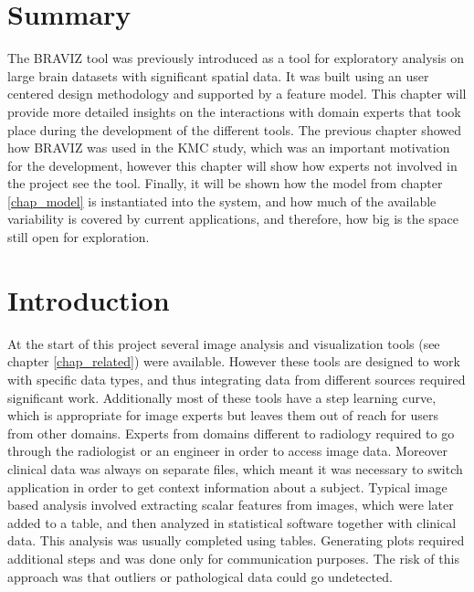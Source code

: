 



\section{Summary}

The BRAVIZ tool was previously introduced as a tool for exploratory analysis on large brain datasets with significant spatial data. It was built using an user centered design methodology and supported by a feature model. This chapter will provide more detailed insights on the interactions with domain experts that took place during the development of the different tools. The previous chapter showed how BRAVIZ was used in the KMC study, which was an important motivation for the development, however this chapter will show how experts not involved in the project see the tool. Finally, it will be shown how the model from chapter \ref{chap_model} is instantiated into the system, and how much of the available variability is covered by current applications, and therefore, how big is the space still open for exploration.

\section{Introduction}

At the start of this project several image analysis and visualization tools (see chapter \ref{chap_related}) were available. However these tools are designed to work with specific data types, and thus integrating data from different sources required significant work. Additionally most of these tools have a step learning curve, which is appropriate for image experts but leaves them out of reach for users from other domains. Experts from domains different to radiology required to go through the radiologist or an engineer in order to access image data. Moreover clinical data was always on separate files, which meant it was necessary to switch application in order to get context information about a subject. Typical image based analysis involved extracting scalar features from images, which were later added to a table, and then analyzed in statistical software together with clinical data. This analysis was usually completed using tables. Generating plots required additional steps and was done only for communication purposes. The risk of this approach was that outliers or pathological data could go undetected. 

